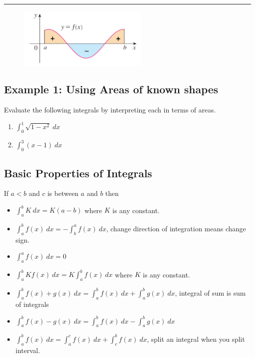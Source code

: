 \documentclass[10pt]{book}
\theoremstyle{definition}
\begin{document}
\noindent\rule{\textwidth}{1pt}
\begin{figure}[h!]
    \includegraphics[width=2.5in]{signedarea.png}
\end{figure}
\clearpage
\subsection*{Example 1: Using Areas of known shapes} Evaluate the following integrals by interpreting each in terms of areas.
\begin{multicols}{2}
    \begin{enumerate}[label=(\alph*)]
        \item $\displaystyle\int_0^1\sqrt{1-x^2}\ dx$
        \item $\displaystyle\int_0^3 (x-1)\ dx$ 
    \end{enumerate}
    \end{multicols}
    \vspace{8cm}
\begin{tcolorbox}
\subsection*{Basic Properties of Integrals}
If $a<b$ and $c$ is between $a$ and $b$ then
\begin{itemize}
    \item $\displaystyle \int_a^b K\ dx=K(a-b)$ where $K$ is any constant.
    \item $\displaystyle \int_a^b f(x)\ dx=-\int_b^a f(x)\ dx$,  change direction of integration means change sign.
    \item $\displaystyle\int_a^a f(x)\ dx=0$
    \item $\displaystyle \int_a^b Kf(x)\ dx=K\int_a^b f(x)\ dx$ where $K$ is any constant.
    \item $\displaystyle\int_a^b f(x)+ g(x)\ dx=\int_a^b f(x)\ dx+\int_a^b g(x)\ dx$, integral of sum is sum of integrals
    \item $\displaystyle\int_a^b f(x)- g(x)\ dx=\int_a^b f(x)\ dx-\int_a^b g(x)\ dx$
    \item $\displaystyle \int_a^b f(x)\ dx=\int_a^c f(x)\ dx+\int_c^b f(x)\ dx$, split an integral  when you split interval.
\end{itemize}
\end{tcolorbox}
\clearpage
\end{document}
